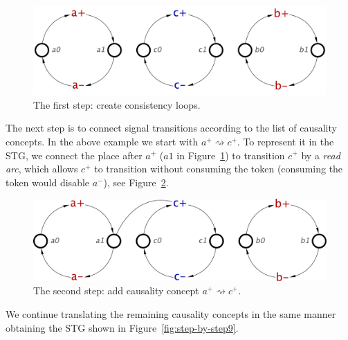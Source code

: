 \documentclass[british, journal]{IEEEtran}
\begin{document}
\begin{figure}[h]
\begin{centering}
\includegraphics[scale=0.3]{Images/Step-by-step1}
\par
\vspace{-2mm}
\protect\caption{\label{fig:step-by-step1}The first step: create consistency loops.}
\end{centering}
\vspace{-5mm}
\end{figure}

The next step is to connect signal transitions according to the list of causality
concepts. In the above example we start with $a^{+}\rightsquigarrow c^{+}$.
To represent it in the STG, we connect the place after $a^{+}$ ($a1$ in
Figure~\ref{fig:step-by-step1}) to transition $c^{+}$ by a \emph{read arc},
which allows $c^{+}$ to transition without consuming the token (consuming
the token would disable $a^{-}$), see Figure~\ref{fig:step-by-step2}.

\begin{figure}[h]
\vspace{-1mm}
\begin{centering}
\includegraphics[scale=0.3]{Images/Step-by-step2}
\par
\vspace{-1mm}
\protect\caption{\label{fig:step-by-step2}The second step: add causality concept $a^{+}\rightsquigarrow c^{+}$.}
\end{centering}
\vspace{-1mm}
\end{figure}

We continue translating the remaining causality concepts in the same manner
obtaining the STG shown in Figure~\ref{fig:step-by-step9}.
\end{document}
